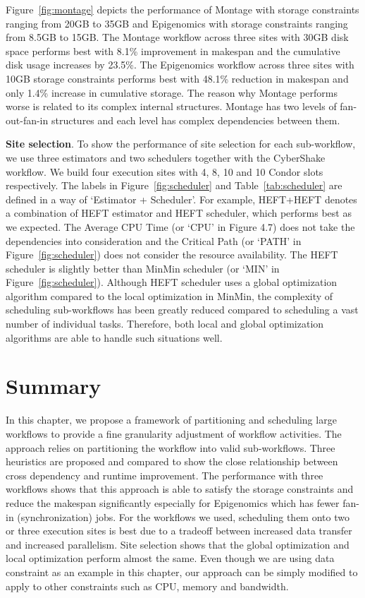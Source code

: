 Figure~\ref{fig:montage} depicts the performance of Montage with storage constraints ranging from 20GB to 35GB and Epigenomics with storage constraints ranging from 8.5GB to 15GB. The Montage workflow across three sites with 30GB disk space performs best with 8.1\% improvement in makespan and the cumulative disk usage increases by 23.5\%. The Epigenomics workflow across three sites with 10GB storage constraints performs best with 48.1\% reduction in makespan and only 1.4\% increase in cumulative storage. The reason why Montage performs worse is related to its complex internal structures. Montage has two levels of fan-out-fan-in structures and each level has complex dependencies between them.

\textbf{Site selection}. To show the performance of site selection for each sub-workflow, we use three estimators and two schedulers  together with the CyberShake workflow. We build four execution sites with 4, 8, 10 and 10 Condor slots respectively. The labels in Figure~\ref{fig:scheduler} and Table~\ref{tab:scheduler} are defined in a way of ‘Estimator + Scheduler’. For example, HEFT+HEFT denotes a combination of HEFT estimator and HEFT scheduler, which performs best as we expected. The Average CPU Time (or ‘CPU’ in Figure 4.7) does not take the dependencies into consideration and the Critical Path (or ‘PATH’ in Figure~\ref{fig:scheduler}) does not consider the resource availability. The HEFT scheduler is slightly better than MinMin scheduler (or ‘MIN’ in Figure~\ref{fig:scheduler}). Although HEFT scheduler uses a global optimization algorithm compared to the local optimization in MinMin, the complexity of scheduling sub-workflows has been greatly reduced compared to scheduling a vast number of individual tasks. Therefore, both local and global optimization algorithms are able to handle such situations well.


\section{Summary}

In this chapter, we propose a framework of partitioning and scheduling large workflows to provide a fine granularity adjustment of workflow activities. The approach relies on partitioning the workflow into valid sub-workflows. Three heuristics are proposed and compared to show the close relationship between cross dependency and runtime improvement. The performance with three workflows shows that this approach is able to satisfy the storage constraints and reduce the makespan significantly especially for Epigenomics which has fewer fan-in (synchronization) jobs. For the workflows we used, scheduling them onto two or three execution sites is best due to a tradeoff between increased data transfer and increased parallelism. Site selection shows that the global optimization and local optimization perform almost the same.  Even though we are using data constraint as an example in this chapter, our approach can be simply modified to apply to other constraints such as CPU, memory and bandwidth. 

